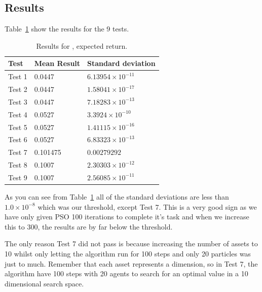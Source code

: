 \documentclass{pdfmx4020}
\begin{document}
    \subsection{Results} %
    \label{sub:results}
      Table~\ref{table:expected_results} show the results for the 9 tests.
        \begin{table}[H]
          \setlength{\extrarowheight}{2.0pt}
          \begin{tabular}{|l|l|l|}
            \hline
            Test & Mean Result & Standard deviation \\
            \hline
            Test 1 & 0.0447 & $6.13954\times10^{-11}$ \\
            \hline
            Test 2 & 0.0447 & $1.58041\times10^{-17}$ \\
            \hline
            Test 3 & 0.0447 & $7.18283\times10^{-13}$ \\
            \hline
            Test 4 & 0.0527 & $3.3924\times10^{-10}$ \\
            \hline
            Test 5 & 0.0527 & $1.41115\times10^{-16}$ \\
            \hline
            Test 6 & 0.0527 & $6.83323\times10^{-13}$ \\
            \hline
            Test 7 & 0.101475 & $0.00279292$ \\
            \hline
            Test 8 & 0.1007 & $2.30303\times10^{-12}$ \\
            \hline
            Test 9 & 0.1007 & $2.56085\times10^{-11}$ \\
            \hline
          \end{tabular}
          \caption{Results for , expected return.}
          \label{table:expected_results}
        \end{table}
      As you can see from Table~\ref{table:expected_results} all of the standard deviations are less than $1.0\times10^{-8}$ which was our threshold, except Test 7. This is a very good sign as we have only given PSO 100 iterations to complete it's task and when we increase this to 300, the results are by far below the threshold. 

      The only reason Test 7 did not pass is because increasing the number of assets to 10 whilst only letting the algorithm run for 100 steps and only 20 particles was just to much. Remember that each asset represents a dimension, so in Test 7, the algorithm have 100 steps with 20 agents to search for an optimal value in a 10 dimensional search space.
\end{document}
